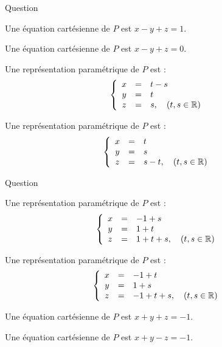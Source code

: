 \begin{multi}[multiple,feedback=
{Une équation de \(P\) est de la forme : \(x-y+z+a=0\) et on cherche \(a\) pour que \(A\) appartienne à \(P\). On résout cette équation pour trouver une représentation paramétrique. 
}]{Question}
    \item Une équation cartésienne de \(P\) est \(x-y+z=1\).
    \item* Une équation cartésienne de \(P\) est \(x-y+z=0\).
    \item* Une représentation paramétrique de \(P\) est :
\[\left\{\begin{array}{ccl}x&=&t-s\\y&=&t\\ z&=&s,\quad (t,s\in \mathbb{R}) \end{array}\right.\]
    \item* Une représentation paramétrique de \(P\) est :
\[\left\{\begin{array}{ccl}x&=&t\\y&=&s\\ z&=&s-t,\quad (t,s \in \mathbb{R})\end{array}\right.\]
\end{multi}


\begin{multi}[multiple,feedback=
{On peut trouver une équation cartésienne, à partir d'une représentation paramétrique,  en éliminant les paramètres.
}]{Question}
    \item* Une représentation paramétrique de \(P\) est :
\[\left\{\begin{array}{ccl}x&=&-1+s\\y&=&1+t\\ z&=&1+t+s,\quad (t,s\in \mathbb{R}) \end{array}\right.\]
    \item Une représentation paramétrique de \(P\) est :
\[\left\{\begin{array}{ccl}x&=&-1+t\\y&=&1+s\\ z&=&-1+t+s,\quad (t,s\in \mathbb{R})\end{array}\right.\]
    \item Une équation cartésienne de \(P\) est \(x+y+z=-1\).
    \item* Une équation cartésienne de \(P\) est \(x+y-z=-1\).
\end{multi}


